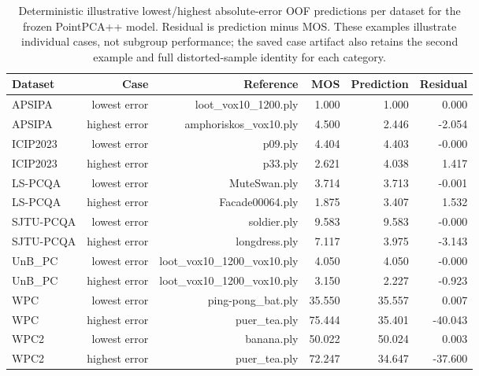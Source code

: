 \documentclass[final,3p,times,twocolumn]{elsarticle}
\begin{document}
\begin{table}[t!]
    \centering
    \caption{Deterministic illustrative lowest/highest absolute-error OOF predictions per dataset for the frozen PointPCA++ model. Residual is prediction minus MOS. These examples illustrate individual cases, not subgroup performance; the saved case artifact also retains the second example and full distorted-sample identity for each category.}
    \label{tab_review_cases}
    \scriptsize
    \begin{adjustbox}{max width=\textwidth}
        \begin{tabular}{lrrrrr}
        \toprule
        Dataset & Case & Reference & MOS & Prediction & Residual \\
        \midrule
        APSIPA & lowest error & loot\_vox10\_1200.ply & 1.000 & 1.000 & 0.000 \\
        APSIPA & highest error & amphoriskos\_vox10.ply & 4.500 & 2.446 & -2.054 \\
        ICIP2023 & lowest error & p09.ply & 4.404 & 4.403 & -0.000 \\
        ICIP2023 & highest error & p33.ply & 2.621 & 4.038 & 1.417 \\
        LS-PCQA & lowest error & MuteSwan.ply & 3.714 & 3.713 & -0.001 \\
        LS-PCQA & highest error & Facade00064.ply & 1.875 & 3.407 & 1.532 \\
        SJTU-PCQA & lowest error & soldier.ply & 9.583 & 9.583 & -0.000 \\
        SJTU-PCQA & highest error & longdress.ply & 7.117 & 3.975 & -3.143 \\
        UnB\_PC & lowest error & loot\_vox10\_1200\_vox10.ply & 4.050 & 4.050 & -0.000 \\
        UnB\_PC & highest error & loot\_vox10\_1200\_vox10.ply & 3.150 & 2.227 & -0.923 \\
        WPC & lowest error & ping-pong\_bat.ply & 35.550 & 35.557 & 0.007 \\
        WPC & highest error & puer\_tea.ply & 75.444 & 35.401 & -40.043 \\
        WPC2 & lowest error & banana.ply & 50.022 & 50.024 & 0.003 \\
        WPC2 & highest error & puer\_tea.ply & 72.247 & 34.647 & -37.600 \\
        \bottomrule
        \end{tabular}
    \end{adjustbox}
\end{table}
\end{document}
